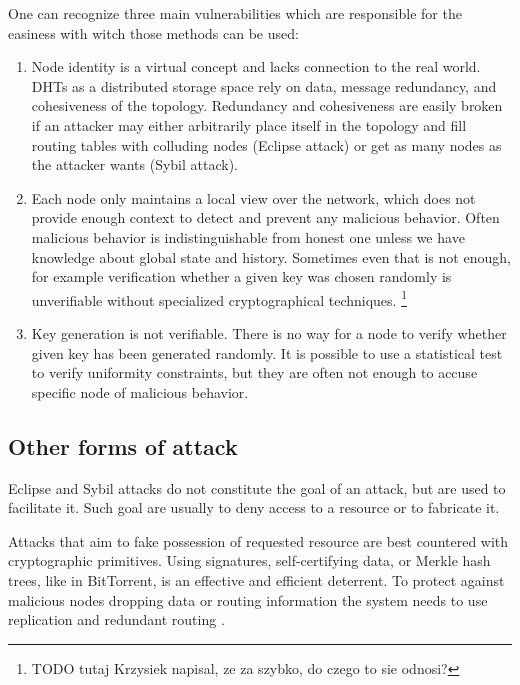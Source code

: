   One can recognize three main vulnerabilities which are responsible for the
  easiness with witch those methods can be used:

  \begin{enumerate}
    \item Node identity is a virtual concept and lacks connection to the real
      world. DHTs as a distributed storage space rely on data, message
      redundancy, and cohesiveness of the topology. Redundancy and cohesiveness
      are easily broken if an attacker may either arbitrarily place itself in
      the topology and fill routing tables with colluding nodes (Eclipse attack)
      or get as many nodes as the attacker wants (Sybil attack).

    \item Each node only maintains a local view over the network, which does not
      provide enough context to detect and prevent any malicious behavior. Often
      malicious behavior is indistinguishable from honest one unless we have
      knowledge about global state and history.  Sometimes even that is not
      enough, for example verification whether a given key was chosen randomly
      is unverifiable without specialized cryptographical techniques. 
     \footnote{TODO tutaj Krzysiek napisal, ze za szybko, do czego to sie odnosi?}

   \item  Key generation is not verifiable. There is no way for a node to verify
     whether given key has been generated randomly. It is possible to use a
     statistical test to verify uniformity constraints, but they are often not
     enough to accuse specific node of malicious behavior.
  \end{enumerate}

\subsection{Other forms of attack}
  Eclipse and Sybil attacks do not constitute the goal of an attack, but are
  used to facilitate it. Such goal are usually to deny access to a resource or
  to fabricate it.

  Attacks that aim to fake possession of requested resource are best countered
  with cryptographic primitives. Using signatures, self-certifying data, or
  Merkle hash trees, like in BitTorrent, is an effective and efficient
  deterrent. To protect against malicious nodes dropping data or routing
  information the system needs to use replication and redundant routing
  \cite{dou02}. 

